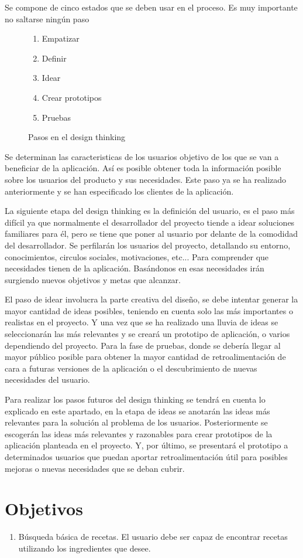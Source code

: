Se compone de cinco estados que se deben usar en el proceso. Es muy importante no saltarse ningún paso
\begin{figure}[h]
    \begin{enumerate}
        \item Empatizar
        \item Definir
        \item Idear
        \item Crear prototipos
        \item Pruebas
    \end{enumerate}
    \caption{Pasos en el design thinking}
    \label{list:stepsDesign}
\end{figure}

Se determinan las caracteristicas de los usuarios objetivo de los que se van a beneficiar de la aplicación. Así es posible obtener toda la información posible sobre los usuarios del producto y sus necesidades. Este paso ya se ha realizado anteriormente y se han especificado los clientes de la aplicación.

La siguiente etapa del \gls{design thinking} es la definición del usuario, es el paso más difícil ya que normalmente el desarrollador del proyecto tiende a idear soluciones familiares para él, pero se tiene que poner al usuario por delante de la comodidad del desarrollador. Se perfilarán los usuarios del proyecto, detallando su entorno, conocimientos, circulos sociales, motivaciones, etc... Para comprender que necesidades tienen de la aplicación. Basándonos en esas necesidades irán surgiendo nuevos objetivos y metas que alcanzar.

El paso de idear involucra la parte creativa del diseño, se debe intentar generar la mayor cantidad de ideas posibles, teniendo en cuenta solo las más importantes o realistas en el proyecto. Y una vez que se ha realizado una lluvia de ideas se seleccionarán las más relevantes y se creará un prototipo de aplicación, o varios dependiendo del proyecto. Para la fase de pruebas, donde se debería llegar al mayor público posible para obtener la mayor cantidad de retroalimentación de cara a futuras versiones de la aplicación o el descubrimiento de nuevas necesidades del usuario. \cite{wolniak2017design}

Para realizar los pasos futuros del \gls{design thinking} se tendrá en cuenta lo explicado en este apartado, en la etapa de ideas se anotarán las ideas más relevantes para la solución al problema de los usuarios. Posteriormente se escogerán las ideas más relevantes y razonables para crear prototipos de la aplicación planteada en el proyecto. Y, por último, se presentará el prototipo a determinados usuarios que puedan aportar retroalimentación útil para posibles mejoras o nuevas necesidades que se deban cubrir.

\section{Objetivos}
\begin{enumerate} 
    \item Búsqueda básica de recetas. El usuario debe ser capaz de encontrar recetas utilizando los ingredientes que desee.
\end{enumerate}